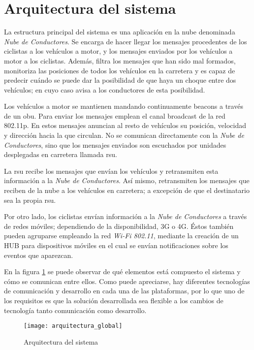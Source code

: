 \section{Arquitectura del sistema}\label{section:arquitecturaSistema}
La estructura principal del sistema es una aplicación en la nube denominada
\emph{Nube de Conductores}. Se encarga de hacer llegar los mensajes procedentes
de los ciclistas a los vehículos a motor, y los mensajes enviados por los vehículos
a motor a los ciclistas. Además, filtra los mensajes que han sido mal formados,
monitoriza las posiciones de todos los vehículos en la carretera y es capaz de
predecir cuándo se puede dar la posibilidad de que haya un choque entre dos vehículos;
en cuyo caso avisa a los conductores de esta posibilidad.

Los vehículos a motor se mantienen mandando continuamente beacons a través de un
\gls{obu}. Para enviar los mensajes emplean el canal broadcast de la red 802.11p.
En estos mensajes anuncian al resto de vehículos su posición, velocidad y dirección
hacia la que circulan. No se comunican directamente con la \emph{Nube de Conductores},
sino que los mensajes enviados son escuchados por unidades desplegadas en carretera
llamada \gls{rsu}.

La \gls{rsu} recibe los mensajes que envían los vehículos y retransmiten esta
información a la \emph{Nube de Conductores}. Así mismo, retransmiten los mensajes
que reciben de la nube a los vehículos en carretera; a excepción de que el
destinatario sea la propia \gls{rsu}.

Por otro lado, los ciclistas envían información a la \emph{Nube de Conductores} a
través de redes móviles; dependiendo de la disponibilidad, 3G o 4G. Éstos también
pueden agruparse empleando la red \emph{Wi-Fi 802.11}, mediante la creación de un
HUB para dispositivos móviles en el cual se envían notificaciones sobre los eventos
que aparezcan.

En la figura \ref{fig:ArquitecturaSistema} se puede observar de qué elementos está
compuesto el sistema y cómo se comunican entre ellos. Como puede apreciarse, hay
diferentes tecnologías de comunicación y desarrollo en cada una de las plataformas,
por lo que uno de los requisitos es que la solución desarrollada sea flexible a los
cambios de tecnología tanto comunicación como desarrollo.

\begin{figure}[H]
	\begin{center}
		\texttt{[image: arquitectura\_global]}
		\caption{Arquitectura del sistema}
		\label{fig:ArquitecturaSistema}
	 \end{center}
\end{figure}
